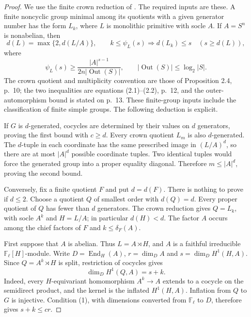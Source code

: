 \begin{proof}
We use the finite crown reduction of
\cite[Lemma 2.5 and Proposition 2.6, pp.~10--13]{LucchiniMarionTracey2020D}.
The required inputs are these.  A finite noncyclic group minimal
among its quotients with a given generator number has the form
$L_k$, where $L$ is monolithic primitive with socle $A$.
If $A=S^n$ is nonabelian, then
\[
 d(L)=\max\{2,d(L/A)\},\qquad
 k\leq\psi_L(s)\Longrightarrow d(L_k)\leq s
 \quad(s\geq d(L)),
\]
where
\[
 \psi_L(s)\geq
 \frac{|A|^{s-1}}{2n|\operatorname{Out}(S)|},
 \qquad |\operatorname{Out}(S)|\leq\log_2|S|.
\]
The crown quotient and multiplicity convention are those of
Proposition 2.4, p.~10; the two inequalities are equations
(2.1)--(2.2), p.~12, and the outer-automorphism bound is stated
on p.~13.  These finite-group inputs include the classification
of finite simple groups.  The following deduction is explicit.

If $G$ is $d$-generated, cocycles are determined by their values
on $d$ generators, proving the first bound with $c\geq d$.
Every crown quotient $L_m$ is also $d$-generated.  The $d$-tuple
in each coordinate has the same prescribed image in $(L/A)^d$,
so there are at most $|A|^d$ possible coordinate tuples.
Two identical tuples would force the generated group into a
proper equality diagonal.  Therefore $m\leq|A|^d$, proving
the second bound.

Conversely, fix a finite quotient $F$ and put $d=d(F)$.
There is nothing to prove if $d\leq2$.  Choose a quotient $Q$
of smallest order with $d(Q)=d$.  Every proper quotient of $Q$
has fewer than $d$ generators.  The crown reduction gives
$Q=L_k$, with socle $A^k$ and $H=L/A$; in particular
$d(H)<d$.  The factor $A$ occurs among the chief factors of
$F$ and $k\leq\delta_F(A)$.

First suppose that $A$ is abelian.  Thus $L=A\rtimes H$, and
$A$ is a faithful irreducible $\mathbb F_\ell[H]$-module.
Write $D=\operatorname{End}_H(A)$, $r=\dim_D A$ and
$s=\dim_D H^1(H,A)$.  Since $Q=A^k\rtimes H$ is split,
restriction of cocycles gives
\[
 \dim_D H^1(Q,A)=s+k.
\]
Indeed, every $H$-equivariant homomorphism $A^k\to A$
extends to a cocycle on the semidirect product, and the kernel
is the inflated $H^1(H,A)$.  Inflation from $Q$ to $G$ is
injective.  Condition (1), with dimensions converted from
$\mathbb F_\ell$ to $D$, therefore gives $s+k\leq cr$.


\end{proof}

